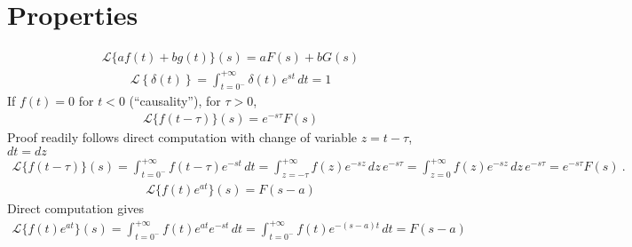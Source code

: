 \documentclass[letterpaper,10pt,english]{jupyterBook}
\begin{document}
\section{Properties}
\label{\detokenize{ch/complex/laplace:properties}}
\sphinxAtStartPar
{}
\begin{equation*}
\begin{split}\mathscr{L}\{ a f(t) + b g(t) \}(s) = a F(s) + b G(s)\end{split}
\end{equation*}
\sphinxAtStartPar
{}
\begin{equation*}
\begin{split}\mathscr{L}\left\{ \delta(t) \right\} = \int_{t=0^-}^{+\infty} \delta(t) \, e^{st} \, dt = 1 \end{split}
\end{equation*}
\sphinxAtStartPar
{} If \(f(t) = 0\) for \(t < 0\) (“causality”), for \(\tau > 0\),
\begin{equation*}
\begin{split}\mathscr{L}\{ f(t-\tau) \}(s) = e^{-s \tau} F(s)\end{split}
\end{equation*}
\sphinxAtStartPar
Proof readily follows direct computation with change of variable \(z = t - \tau\), \(dt = dz\)
\begin{equation*}
\begin{split}\mathscr{L}\{ f(t - \tau) \}(s) = \int_{t=0^-}^{+\infty} f(t-\tau) e^{-s t} \, dt = \int_{z = - \tau}^{+\infty} f(z) e^{-s z } \, dz \, e^{-s \tau} = \int_{z = 0}^{+\infty} f(z) e^{-s z } \, dz \, e^{-s \tau} = e^{-s \tau} F(s) \ . \end{split}
\end{equation*}
\sphinxAtStartPar
{}
\begin{equation*}
\begin{split}\mathscr{L}\{ f(t) e^{a t} \}(s) = F(s-a)\end{split}
\end{equation*}
\sphinxAtStartPar
Direct computation gives
\begin{equation*}
\begin{split}\mathscr{L}\{ f(t) e^{a t} \}(s) = \int_{t=0^-}^{+\infty} f(t) e^{a t} e^{-st} \, dt =  \int_{t=0^-}^{+\infty} f(t) e^{-(s-a)t} \, dt = F(s-a)\end{split}
\end{equation*}
\end{document}
